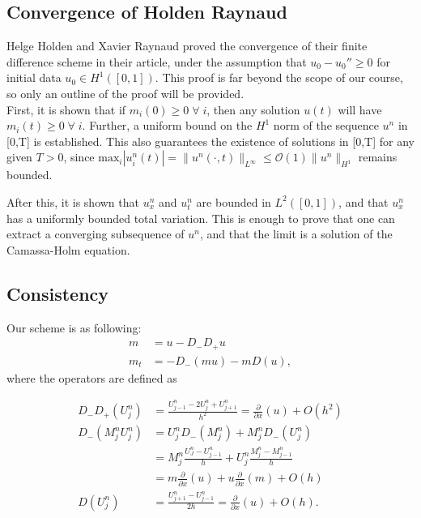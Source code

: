 \subsection*{Convergence of Holden Raynaud}
Helge Holden and Xavier Raynaud proved the convergence of their finite difference scheme in their article, under the assumption that $u_{0} - u_{0}'' \geq 0$ for initial data $u_{0} \in H^{1}([0,1])$. This proof is far beyond the scope of our course, so only an outline of the proof will be provided. \\

First, it is shown that if $m_{i}(0) \geq 0 \; \forall \;i$, then any solution $u(t)$ will have $m_{i}(t) \geq 0 \; \forall \;i $. Further, a uniform bound on the $H^{1}$ norm of the sequence $u^{n}$ in [0,T] is established. This also guarantees the existence of solutions in [0,T] for any given $T > 0$, since $\text{max}_{i}|u_{i}^{n}(t)| = \|u^{n}(\cdot,t)\|_{L^{\infty}} \leq \mathcal{O}(1) \|u^{n}\|_{H^{1}}$ remains bounded.

After this, it is shown that $u_{x}^{n}$ and $u_{t}^{n}$ are bounded in $L^{2}([0,1])$, and that $u_{x}^{n}$ has a uniformly bounded total variation. This is enough to prove that one can extract a converging subsequence of $u^{n}$, and that the limit is a solution of the Camassa-Holm equation. 

\subsection*{Consistency}
Our scheme is as following:
\begin{align}
m &= u - D_- D_+ u \\
m_t &=- D_- ( m u ) - m D ( u ),
\end{align}
where the operators are defined as

\begin{align}
D_- D_+ \left( U_j^n \right)  &= \frac{U_{j-1}^n - 2 U_j^n + U_{j+1}^n}{h^2} = \frac{\partial}{\partial x} (u) + O \left( h^ 2 \right) \\
 D_- \left(M_j^n U_j^n \right) &= U_j^n D_-( M_j^n ) + M_j^n D_- (U_j^n) \\
  &= M_j^n \frac{U_J^n - U_{j-1}^n}{h} + U_j^n \frac{M_{j}^n - M_{j-1}^n}{h} \\
  &= m \frac{\partial}{\partial x} (u) + u \frac{\partial}{\partial x} (m) + O \left( h \right)  \\
D \left(U_j^n \right) &= \frac{U_{j+1}^n - U_{j-1}^n}{2h} = \frac{\partial}{\partial x} (u) + O \left( h \right).
\end{align}

